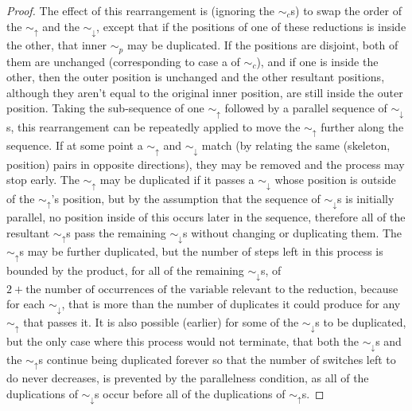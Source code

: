 \documentclass{article}
\theoremstyle{definition}
\theoremstyle{lemma}
\theoremstyle{remark}
\begin{document}
\begin{proof}
  The effect of this rearrangement is (ignoring the $\sim_c$s) to swap the order of the $\sim_\uparrow$ and the $\sim_\downarrow$, except that if the positions of one of these reductions is inside the other, that inner $\sim_p$ may be duplicated. If the positions are disjoint, both of them are unchanged (corresponding to case a of $\sim_c$), and if one is inside the other, then the outer position is unchanged and the other resultant positions, although they aren't equal to the original inner position, are still inside the outer position. Taking the sub-sequence of one $\sim_\uparrow$ followed by a parallel sequence of $\sim_\downarrow$s, this rearrangement can be repeatedly applied to move the $\sim_\uparrow$ further along the sequence. If at some point a $\sim_\uparrow$ and $\sim_\downarrow$ match (by relating the same (skeleton, position) pairs in opposite directions), they may be removed and the process may stop early. The $\sim_\uparrow$ may be duplicated if it passes a $\sim_\downarrow$ whose position is outside of the $\sim_\uparrow$'s position, but by the assumption that the sequence of $\sim_\downarrow$s is initially parallel, no position inside of this occurs later in the sequence, therefore all of the resultant $\sim_\uparrow$s pass the remaining $\sim_\downarrow$s without changing or duplicating them. The $\sim_\uparrow$s may be further duplicated, but the number of steps left in this process is bounded by the product, for all of the remaining $\sim_\downarrow$s, of $2 + \text{the number of occurrences of the variable relevant to the reduction}$, because for each $\sim_\downarrow$, that is more than the number of duplicates it could produce for any $\sim_\uparrow$ that passes it. It is also possible (earlier) for some of the $\sim_\downarrow$s to be duplicated, but the only case where this process would not terminate, that both the $\sim_\downarrow$s and the $\sim_\uparrow$s continue being duplicated forever so that the number of switches left to do never decreases, is prevented by the parallelness condition, as all of the duplications of $\sim_\downarrow$s occur before all of the duplications of $\sim_\uparrow$s.


\end{proof}
\end{document}
